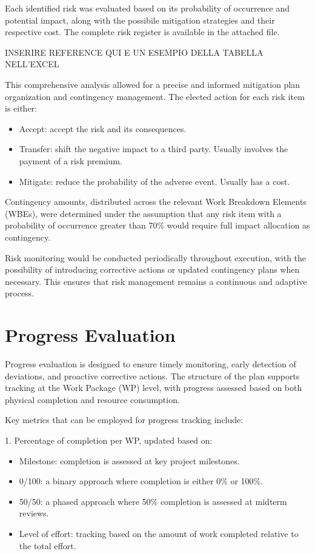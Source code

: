 Each identified risk was evaluated based on its probability of occurrence and potential impact, along with the possibile mitigation strategies and their respective cost.
The complete risk register is available in the attached file.

INSERIRE REFERENCE QUI E UN ESEMPIO DELLA TABELLA NELL'EXCEL

This comprehensive analysis allowed for a precise and informed mitigation plan organization and contingency management.
The elected action for each risk item is either:
\begin{itemize}
    \item Accept: accept the risk and its consequences.
    \item Transfer: shift the negative impact to a third party. Usually involves the payment of a risk premium.
    \item Mitigate: reduce the probability of the adverse event. Usually has a cost.
\end{itemize}

Contingency amounts, distributed across the relevant Work Breakdown Elements (WBEs), were determined under the assumption that any risk item with a probability of occurrence greater than 70\% would require full impact allocation as contingency.

Risk monitoring would be conducted periodically throughout execution, with the possibility of introducing corrective actions or updated contingency plans when necessary. This ensures that risk management remains a continuous and adaptive process.

\section{Progress Evaluation}

Progress evaluation is designed to ensure timely monitoring, early detection of deviations, and proactive corrective actions. The structure of the plan supports tracking at the Work Package (WP) level, with progress assessed based on both physical completion and resource consumption.

Key metrics that can be employed for progress tracking include:

1.   Percentage of completion per WP, updated based on:
\begin{itemize}
    \item Milestone: completion is assessed at key project milestones.
    \item 0/100: a binary approach where completion is either 0\% or 100\%.
    \item 50/50: a phased approach where 50\% completion is assessed at midterm reviews.
    \item Level of effort: tracking based on the amount of work completed relative to the total effort.
\end{itemize}

